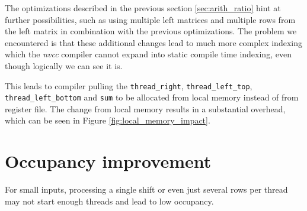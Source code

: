 The optimizations described in the previous section \ref{sec:arith_ratio} hint at further possibilities, such as using multiple left matrices and multiple rows from the left matrix in combination with the previous optimizations. The problem we encountered is that these additional changes lead to much more complex indexing which the \textit{nvcc} compiler cannot expand into static compile time indexing, even though logically we can see it is. %

This leads to compiler pulling the \texttt{thread\_right}, \texttt{thread\_left\_top}, \texttt{thread\_left\_bottom} and \texttt{sum} to be allocated from local memory instead of from register file. The change from local memory results in a substantial overhead, which can be seen in Figure \ref{fig:local_memory_impact}. 



\section{Occupancy improvement}

For small inputs, processing a single shift or even just several rows per thread may not start enough threads and lead to low occupancy.  



